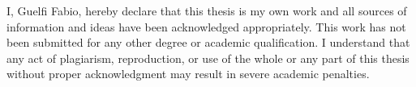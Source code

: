 \begin{originality}

I, Guelfi Fabio, hereby declare that this thesis is my own work and all sources of information and ideas have been acknowledged appropriately. This work has not been submitted for any other degree or academic qualification. I understand that any act of plagiarism, reproduction, or use of the whole or any part of this thesis without proper acknowledgment may result in severe academic penalties.
\end{originality}